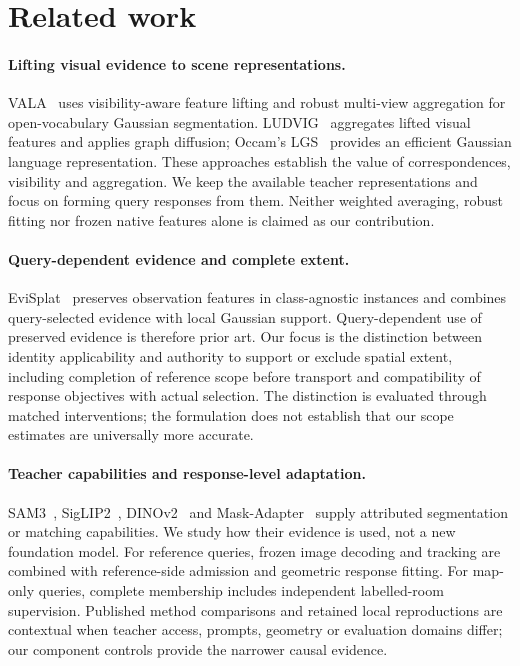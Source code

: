 \section{Related work}
\paragraph{Lifting visual evidence to scene representations.}
VALA~\cite{vala} uses visibility-aware feature lifting and robust multi-view
aggregation for open-vocabulary Gaussian segmentation. LUDVIG~\cite{ludvig}
aggregates lifted visual features and applies graph diffusion; Occam's
LGS~\cite{occam} provides an efficient Gaussian language representation.
These approaches establish the value of correspondences, visibility and
aggregation. We keep the available teacher representations and focus on
forming query responses from them. Neither weighted averaging, robust fitting
nor frozen native features alone is claimed as our contribution.

\paragraph{Query-dependent evidence and complete extent.}
EviSplat~\cite{evisplat} preserves observation features in class-agnostic
instances and combines query-selected evidence with local Gaussian support.
Query-dependent use of preserved evidence is therefore prior art. Our focus is
the distinction between identity applicability and authority to support or
exclude spatial extent, including completion of reference scope before
transport and compatibility of response objectives with actual selection.
The distinction is evaluated through matched interventions; the formulation
does not establish that our scope estimates are universally more accurate.

\paragraph{Teacher capabilities and response-level adaptation.}
SAM3~\cite{sam3}, SigLIP2~\cite{siglip2}, DINOv2~\cite{dinov2} and
Mask-Adapter~\cite{maskadapter} supply attributed segmentation or matching
capabilities. We study how their evidence is used, not a new foundation model.
For reference queries, frozen image decoding and tracking are combined with
reference-side admission and geometric response fitting. For map-only queries,
complete membership includes independent labelled-room supervision. Published
method comparisons and retained local reproductions are contextual when
teacher access, prompts, geometry or evaluation domains differ; our component
controls provide the narrower causal evidence.
